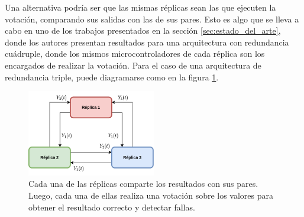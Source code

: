 
Una alternativa podría ser que las mismas réplicas sean las que ejecuten la votación, comparando sus salidas con las de sus pares. Esto es algo que se lleva a cabo en uno de los trabajos presentados en la sección \ref{sec:estado_del_arte}, donde los autores presentan resultados para una arquitectura con redundancia cuádruple, donde los mismos microcontroladores de cada réplica son los encargados de realizar la votación. %
Para el caso de una arquitectura de redundancia triple, puede diagramarse como en la figura \ref{fig:TMR_sin_arbitro}.


\begin{figure}[htb]
    \centering
    \includegraphics[width=0.5\textwidth]{img/TMR_sin_arbitro.png}
    \caption{Cada una de las réplicas comparte los resultados con sus pares. Luego, cada una de ellas realiza una votación sobre los valores para obtener el resultado correcto y detectar fallas.}
    \label{fig:TMR_sin_arbitro}
\end{figure}

